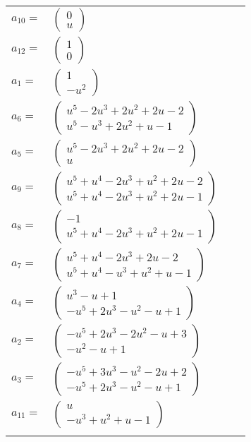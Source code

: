 \documentclass[1p]{elsarticle_modified}
\theoremstyle{definition}
\begin{document}
\begin{tabular}{m{7pt} m{180pt} m{7pt} m{180pt} }
\flushright $a_{10}=$&$\begin{pmatrix}0\\u\end{pmatrix}$ \\
\flushright $a_{12}=$&$\begin{pmatrix}1\\0\end{pmatrix}$ \\
\flushright $a_{1}=$&$\begin{pmatrix}1\\- u^2\end{pmatrix}$ \\
\flushright $a_{6}=$&$\begin{pmatrix}u^5-2 u^3+2 u^2+2 u-2\\u^5- u^3+2 u^2+u-1\end{pmatrix}$ \\
\flushright $a_{5}=$&$\begin{pmatrix}u^5-2 u^3+2 u^2+2 u-2\\u\end{pmatrix}$ \\
\flushright $a_{9}=$&$\begin{pmatrix}u^5+u^4-2 u^3+u^2+2 u-2\\u^5+u^4-2 u^3+u^2+2 u-1\end{pmatrix}$ \\
\flushright $a_{8}=$&$\begin{pmatrix}-1\\u^5+u^4-2 u^3+u^2+2 u-1\end{pmatrix}$ \\
\flushright $a_{7}=$&$\begin{pmatrix}u^5+u^4-2 u^3+2 u-2\\u^5+u^4- u^3+u^2+u-1\end{pmatrix}$ \\
\flushright $a_{4}=$&$\begin{pmatrix}u^3- u+1\\- u^5+2 u^3- u^2- u+1\end{pmatrix}$ \\
\flushright $a_{2}=$&$\begin{pmatrix}- u^5+2 u^3-2 u^2- u+3\\- u^2- u+1\end{pmatrix}$ \\
\flushright $a_{3}=$&$\begin{pmatrix}- u^5+3 u^3- u^2-2 u+2\\- u^5+2 u^3- u^2- u+1\end{pmatrix}$ \\
\flushright $a_{11}=$&$\begin{pmatrix}u\\- u^3+u^2+u-1\end{pmatrix}$\\&\end{tabular}
\end{document}
